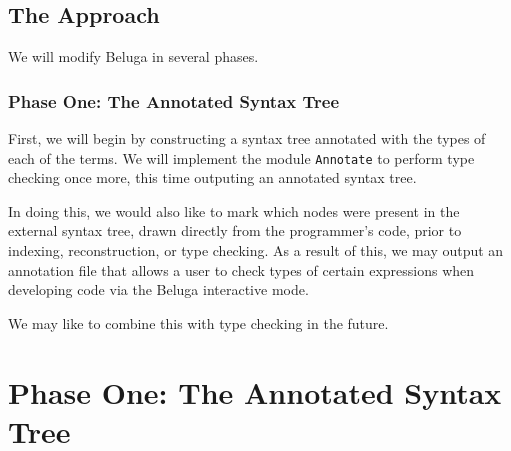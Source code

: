 \documentclass[11pt]{article} %
\begin{document}
\subsection{The Approach}

We will modify Beluga in several phases.

\subsubsection{Phase One: The Annotated Syntax Tree}

First, we will begin by constructing a syntax tree annotated with the types of each of the terms. We will implement the module \verb+Annotate+ to perform type checking once more, this time outputing an annotated syntax tree.

In doing this, we would also like to mark which nodes were present in the external syntax tree, drawn directly from the programmer's code, prior to indexing, reconstruction, or type checking. As a result of this, we may output an annotation file that allows a user to check types of certain expressions when developing code via the Beluga interactive mode.

We may like to combine this with type checking in the future.

\section{Phase One: The Annotated Syntax Tree}
\end{document}
